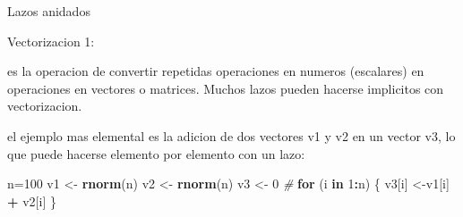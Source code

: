 \documentclass[ignorenonframetext,]{beamer}
\newenvironment{Shaded}{\begin{snugshade}}{\end{snugshade}}
\newcommand{\KeywordTok}[1]{\textcolor[rgb]{0.13,0.29,0.53}{\textbf{#1}}}
\newcommand{\DecValTok}[1]{\textcolor[rgb]{0.00,0.00,0.81}{#1}}
\newcommand{\StringTok}[1]{\textcolor[rgb]{0.31,0.60,0.02}{#1}}
\newcommand{\CommentTok}[1]{\textcolor[rgb]{0.56,0.35,0.01}{\textit{#1}}}
\newcommand{\ControlFlowTok}[1]{\textcolor[rgb]{0.13,0.29,0.53}{\textbf{#1}}}
\newcommand{\OperatorTok}[1]{\textcolor[rgb]{0.81,0.36,0.00}{\textbf{#1}}}
\newcommand{\NormalTok}[1]{#1}
\begin{document}
\begin{frame}[fragile]
\begin{block}{Lazos anidados}
\end{block}

\end{frame}

\begin{frame}[fragile]

\begin{block}{Vectorizacion 1:}

es la operacion de convertir repetidas operaciones en numeros
(escalares) en operaciones en vectores o matrices. Muchos lazos pueden
hacerse implicitos con vectorizacion.

el ejemplo mas elemental es la adicion de dos vectores v1 y v2 en un
vector v3, lo que puede hacerse elemento por elemento con un lazo:

\begin{Shaded}
\begin{Highlighting}[]
\NormalTok{n=}\DecValTok{100}
\NormalTok{v1 <-}\StringTok{ }\KeywordTok{rnorm}\NormalTok{(n)}
\NormalTok{v2 <-}\StringTok{ }\KeywordTok{rnorm}\NormalTok{(n)  }
\NormalTok{v3 <-}\StringTok{ }\DecValTok{0}
\CommentTok{#  }
\ControlFlowTok{for}\NormalTok{ (i }\ControlFlowTok{in} \DecValTok{1}\OperatorTok{:}\NormalTok{n)}
\NormalTok{\{}
\NormalTok{v3[i] <-v1[i] }\OperatorTok{+}\StringTok{ }\NormalTok{v2[i]}
\NormalTok{\}}
\end{Highlighting}
\end{Shaded}

\end{block}

\end{frame}
\end{document}
